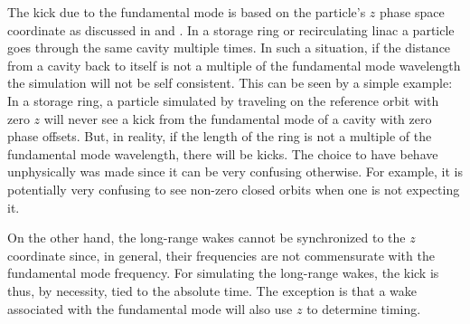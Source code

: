 The kick due to the fundamental mode is based on the particle's $z$
phase space coordinate as discussed in  and
. In a storage ring or recirculating linac a particle
goes through the same cavity multiple times. In such a situation, if
the distance from a cavity back to itself is not a multiple of the
fundamental mode wavelength the simulation will not be self
consistent. This can be seen by a simple example: In a storage ring, a
particle simulated by \bmad traveling on the reference orbit with zero
$z$ will never see a kick from the fundamental mode of a cavity with
zero phase offsets. But, in reality, if the length of the ring is not
a multiple of the fundamental mode wavelength, there will be
kicks. The choice to have \bmad behave unphysically was made since it
can be very confusing otherwise. For example, it is potentially very
confusing to see non-zero closed orbits when one is not expecting it.

On the other hand, the long-range wakes cannot be synchronized to the
$z$ coordinate since, in general, their frequencies are not
commensurate with the fundamental mode frequency. For simulating the
long-range wakes, the kick is thus, by necessity, tied to the absolute
time. The exception is that a wake associated with the fundamental
mode will also use $z$ to determine timing.

%
